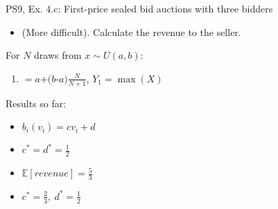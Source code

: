 \begin{frame}{PS9, Ex. 4.c: First-price sealed bid auctions with three bidders}
    \begin{itemize}
      \item[(c)] (More difficult). Calculate the revenue to the seller.
    \end{itemize}
    \vspace{-8pt}
    \begin{multicols}{2}
      \vfill\null\columnbreak
      For $N$ draws from $x\sim U(a, b):$
      \vspace{-6pt}
      \begin{enumerate}
        \item[$\mathbb{E}(Y_1)$] $=a$+$(b$-$a)\frac{N}{N+1}$, $Y_1=\max(X)$
      \end{enumerate}
      \vspace{-6pt}
      Results so far:
      \vspace{-6pt}
      \begin{itemize}
        \item[($*$)] $b_i(v_i) = cv_i+d$
        \item[(3.a)] $c^*=d^*=\frac{1}{2}$
        \item[(3.b)] $\mathbb{E}[revenue]=\frac{5}{3}$
        \item[(4.a)] $c^*=\frac{2}{3},\ d^*=\frac{1}{2}$
      \end{itemize}
      \vfill\null
    \end{multicols}
    \vfill\null
\end{frame}
